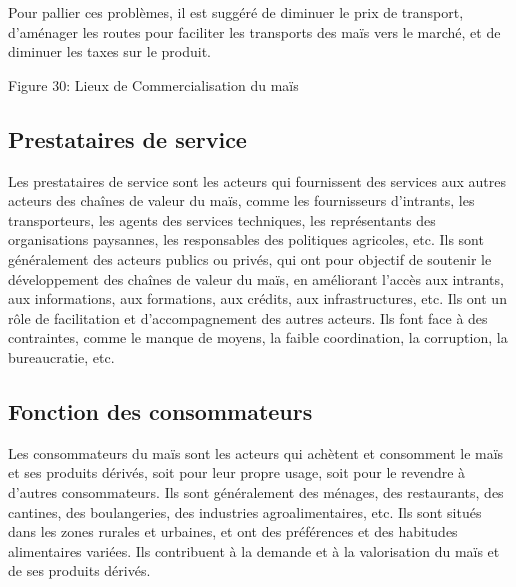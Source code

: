 \documentclass[12pt,oneside]{report}
\begin{document}
Pour pallier ces problèmes, il est suggéré de diminuer le prix de transport, d’aménager les routes pour faciliter les transports des maïs vers le marché, et de diminuer les taxes sur le produit.

Figure 30: Lieux de Commercialisation du maïs

\subsection{Prestataires de service}
Les prestataires de service sont les acteurs qui fournissent des services aux autres acteurs des chaînes de valeur du maïs, comme les fournisseurs d'intrants, les transporteurs, les agents des services techniques, les représentants des organisations paysannes, les responsables des politiques agricoles, etc. Ils sont généralement des acteurs publics ou privés, qui ont pour objectif de soutenir le développement des chaînes de valeur du maïs, en améliorant l'accès aux intrants, aux informations, aux formations, aux crédits, aux infrastructures, etc. Ils ont un rôle de facilitation et d'accompagnement des autres acteurs. Ils font face à des contraintes, comme le manque de moyens, la faible coordination, la corruption, la bureaucratie, etc.

\subsection{Fonction des consommateurs}
Les consommateurs du maïs sont les acteurs qui achètent et consomment le maïs et ses produits dérivés, soit pour leur propre usage, soit pour le revendre à d'autres consommateurs. Ils sont généralement des ménages, des restaurants, des cantines, des boulangeries, des industries agroalimentaires, etc. Ils sont situés dans les zones rurales et urbaines, et ont des préférences et des habitudes alimentaires variées. Ils contribuent à la demande et à la valorisation du maïs et de ses produits dérivés.
\end{document}
